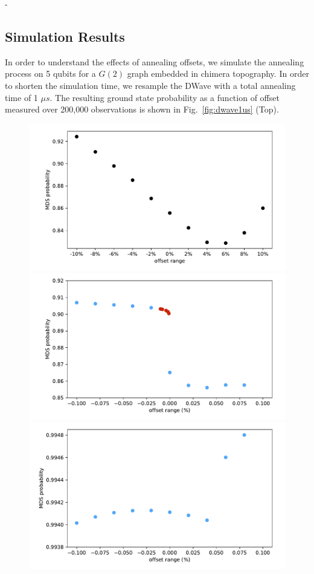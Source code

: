 -\documentclass[prd,twocolumn,tightenlines,preprintnumbers,showpacs,superscriptaddress,notitlepage,nofootinbib,eqsecnum,floatfix,longbibliography]{revtex4}
\begin{document}
\subsection{Simulation Results}

In order to understand the effects of annealing offsets, we simulate the annealing process on 5 qubits for a $G(2)$ graph embedded in chimera topography.
In order to shorten the simulation time, we resample the DWave with a total annealing time of 1 $\mu s$.
The resulting ground state probability as a function of offset measured over 200,000 observations is shown in Fig.~\ref{fig:dwave1us} (Top).

\begin{figure}
    \centering
    \includegraphics[width=\columnwidth]{./figures/dwave1us.pdf}
    \includegraphics[width=\columnwidth]{./figures/sim_deco.pdf}
    \includegraphics[width=\columnwidth]{./figures/sim_nodeco.pdf}

\end{figure}
\end{document}
